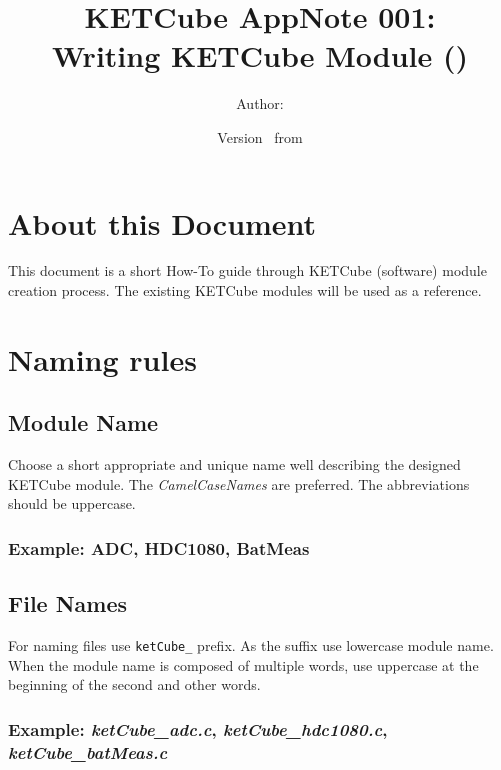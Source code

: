 \documentclass[twoside,a4paper]{refart}
\title{\UWBLogo KETCube AppNote 001:\\ Writing KETCube Module (\vhCurrentVersion)}
\author{Author: \vhListAllAuthorsLongWithAbbrev}
\date{Version \vhCurrentVersion\ from \vhCurrentDate}
\begin{document}

\titlepage
\maketitle

\section*{About this Document}


This document is a short How-To guide through KETCube (software) module creation process. The existing KETCube modules will be used as a reference.


\setcounter{tocdepth}{1}
\tableofcontents
\clearpage

\listoffigures
\listoftables
\begin{versionhistory}
\end{versionhistory}
\setcounter{table}{0}

\clearpage 
{} 
\pagestyle{headings} 

\clearpage
\section{Naming rules}
\subsection*{Module Name}
Choose a short appropriate and unique name well describing the designed KETCube module. The {\it CamelCaseNames} are preferred. The abbreviations should be uppercase.
\subsubsection*{Example: ADC, HDC1080, BatMeas}

\subsection*{File Names}
For naming files use {\tt ketCube\_} prefix. As the suffix use lowercase module name. When the module name is composed of multiple words, use uppercase at the beginning of the second and other words.
\subsubsection*{Example: {\it ketCube\_adc.c}, {\it ketCube\_hdc1080.c}, {\it ketCube\_batMeas.c}}
\end{document}
